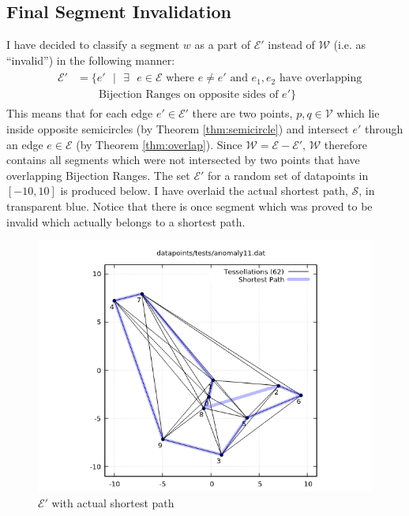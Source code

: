 \documentclass[12pt]{article}
\begin{document}
\subsection*{Final Segment Invalidation}
I have decided to classify a segment $w$ as a part of $\mathcal{E}'$ instead of
$\mathcal{W}$ (i.e. as ``invalid'') in the following manner:
\begin{align*}
&\begin{aligned}
\mathcal{E}' &= \{e'\text{ }|\text{ }\exists\text{ }e \in \mathcal{E} \text{ where } e \neq e'
\text{ and } e_1,e_2 \text{ have overlapping}\\
&\qquad \text{Bijection Ranges on opposite sides of } e'\}
\end{aligned}
\end{align*}
This means that for each edge $e' \in \mathcal{E}'$ there are two points,
$p,q \in \mathcal{V}$ which lie inside opposite semicircles
(by Theorem \ref{thm:semicircle}) and intersect $e'$ through an edge $e \in \mathcal{E}$
(by Theorem \ref{thm:overlap}). Since $\mathcal{W} = \mathcal{E} - \mathcal{E}'$,
$\mathcal{W}$ therefore contains all segments which were not intersected by two
points that have overlapping Bijection Ranges.
The set $\mathcal{E}'$ for a random set of datapoints
in $[-10, 10]$ is produced below. I have overlaid the actual shortest path,
$\mathcal{S}$, in transparent blue. Notice that there is once segment which
was proved to be invalid which actually belongs to a shortest path.
\begin{figure}[h!]
\begin{center}
\includegraphics{e'_random}
\end{center}
\caption{$\mathcal{E}'$ with actual shortest path}\label{fig:E'-short}
\end{figure}
\end{document}
